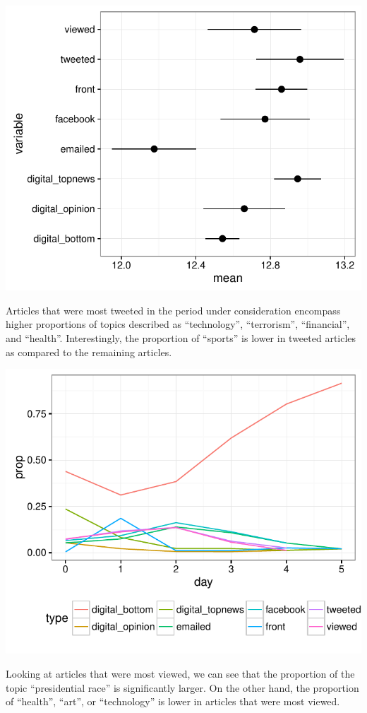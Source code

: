 \documentclass[12pt]{article}\usepackage[]{graphicx}\usepackage[]{color}
\makeatletter
\def\maxwidth{ %
  \ifdim\Gin@nat@width>\linewidth
    \linewidth
  \else
    \Gin@nat@width
  \fi
}
\newenvironment{knitrout}{}{} %
\makeatother
\begin{document}
\clearpage
\begin{knitrout}
\color{fgcolor}
\includegraphics[width=\maxwidth]{figure/unnamed-chunk-10-1} 

\end{knitrout}
Articles that were most tweeted in the period under consideration encompass higher proportions of topics described as ``technology'', ``terrorism'', ``financial'', and ``health''. Interestingly, the proportion of ``sports'' is lower in tweeted articles as compared to the remaining articles.

\clearpage
\begin{knitrout}
\color{fgcolor}
\includegraphics[width=\maxwidth]{figure/unnamed-chunk-11-1} 

\end{knitrout}
Looking at articles that were most viewed, we can see that the proportion of the topic ``presidential race'' is significantly larger. On the other hand, the proportion of ``health'', ``art'', or ``technology'' is lower in articles that were most viewed.
\end{document}
